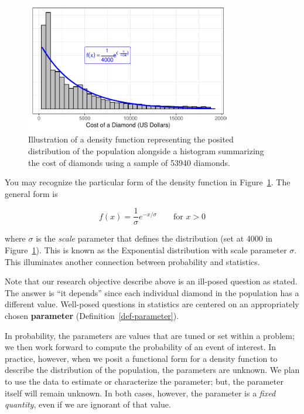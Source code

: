 \documentclass[
  letterpaper,
  DIV=11,
  numbers=noendperiod]{scrreprt}
\theoremstyle{definition}
\theoremstyle{plain}
\theoremstyle{definition}
\theoremstyle{remark}
\begin{document}
\begin{figure}

{\centering \includegraphics[width=0.8\textwidth,height=\textheight]{./images/fig-randomvariables-density-1.pdf}

}

\caption{\label{fig-randomvariables-density}Illustration of a density
function representing the posited distribution of the population
alongside a histogram summarizing the cost of diamonds using a sample of
53940 diamonds.}

\end{figure}

You may recognize the particular form of the density function in
Figure~\ref{fig-randomvariables-density}. The general form is

\[f(x) = \frac{1}{\sigma} e^{-x / \sigma} \qquad \text{for } x > 0\]

where \(\sigma\) is the \emph{scale} parameter that defines the
distribution (set at 4000 in Figure~\ref{fig-randomvariables-density}).
This is known as the Exponential distribution with scale parameter
\(\sigma\). This illuminates another connection between probability and
statistics.

Note that our research objective describe above is an ill-posed question
as stated. The answer is ``it depends'' since each individual diamond in
the population has a different value. Well-posed questions in statistics
are centered on an appropriately chosen \textbf{parameter}
(Definition~\ref{def-parameter}).

In probability, the parameters are values that are tuned or set within a
problem; we then work forward to compute the probability of an event of
interest. In practice, however, when we posit a functional form for a
density function to describe the distribution of the population, the
parameters are unknown. We plan to use the data to estimate or
characterize the parameter; but, the parameter itself will remain
unknown. In both cases, however, the parameter is a \emph{fixed
quantity}, even if we are ignorant of that value.
\end{document}
